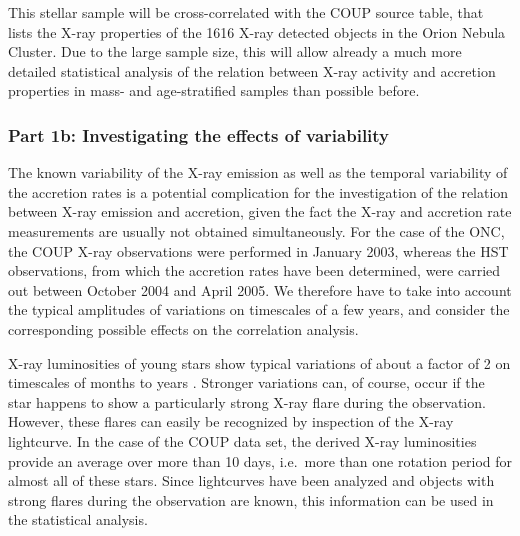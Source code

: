 \documentclass[10pt,fleqn,twoside,a4paper]{article}
\begin{document}
This stellar sample will be cross-correlated with the
COUP source table, that lists the X-ray properties of the 1616 X-ray detected objects
in the Orion Nebula Cluster. Due to the large sample size,
this will allow already a much more detailed statistical analysis of the relation between
X-ray activity and accretion properties in mass- and age-stratified samples
than possible before.



\subsubsection*{Part 1b: Investigating the effects of variability}

The known variability of the X-ray emission as well as the 
temporal variability of the accretion rates is a potential 
complication  for the investigation of the relation between
X-ray emission and accretion, given the fact the X-ray and
accretion rate measurements are usually not obtained simultaneously.
For the case of the ONC, the COUP X-ray observations were performed 
in January 2003, whereas the HST observations, from which the accretion rates
have been determined, were carried out 
between October 2004 and April 2005.
%
We therefore have to take into account the typical amplitudes
of variations on timescales of a few years, and consider
the corresponding possible effects on the correlation analysis.



\smallskip


X-ray luminosities of young stars show typical variations of about
a factor of 2 on timescales of months to years \citep[e.g.][]{Wolk04}.
Stronger variations can, of course,  occur if the star happens to show a
particularly strong X-ray flare during the observation. However,
these flares can easily be recognized by inspection of
the X-ray lightcurve.
%
In the case of the COUP data set, the derived X-ray luminosities
provide an average over more than 10 days, i.e.~more than one
rotation period for almost all of these stars.
Since lightcurves have been analyzed and objects with strong
flares during the observation are known, this information can
be used in the statistical analysis.

\medskip
\end{document}
